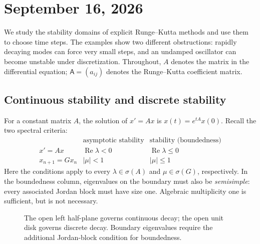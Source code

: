 \section{September 16, 2026}

We study the stability domains of explicit Runge--Kutta methods and
use them to choose time steps. The examples show two different
obstructions: rapidly decaying modes can force very small steps, and
an undamped oscillator can become unstable under discretization.
Throughout, \(A\) denotes the matrix in the differential equation;
\(\mathsf{A}=(a_{ij})\) denotes the Runge--Kutta coefficient matrix.

\subsection{Continuous stability and discrete stability}

For a constant matrix \(A\), the solution of \(x'=Ax\) is
\(x(t)=e^{tA}x(0)\). Recall the two spectral criteria:
\[
\begin{array}{c|c|c}
 &\text{asymptotic stability}&\text{stability (boundedness)}\\ \hline
 x'=Ax&\operatorname{Re}\lambda<0&\operatorname{Re}\lambda\leq0\\
 x_{n+1}=Gx_n&|\mu|<1&|\mu|\leq1
\end{array}
\]
Here the conditions apply to every \(\lambda\in\sigma(A)\) and
\(\mu\in\sigma(G)\), respectively. In the boundedness column,
eigenvalues on the boundary must also be \emph{semisimple}: every
associated Jordan block must have size one. Algebraic multiplicity
one is sufficient, but is not necessary.

\begin{figure}[htbp]
\centering
{}
\caption{The open left half-plane governs continuous decay; the open
unit disk governs discrete decay. Boundary eigenvalues require the
additional Jordan-block condition for boundedness.}
\label{fig:continuous-discrete-sep-16}
\end{figure}

